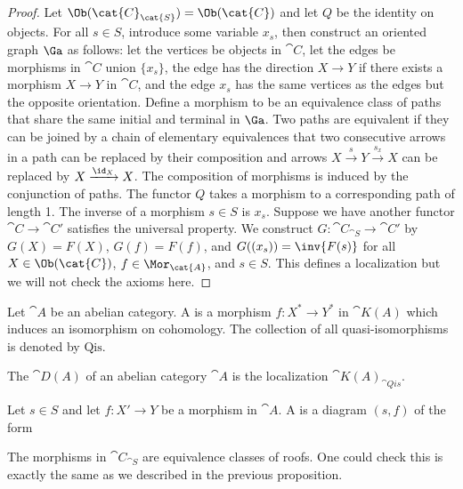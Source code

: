 \begin{proof}
    Let $\Ob({\cat{C}}_{\cat{S}})=\Ob(\cat{C})$ and let $Q$ be the identity on objects. For all $s\in S$, introduce some variable ${x}_{s}$, then construct an oriented graph $\Ga$ as follows: let the vertices be objects in $\cat{C}$, let the edges be morphisms in $\cat{C}$ union $\{{x}_{s}\}$, the edge has the direction $X\to Y$ if there exists a morphism $X\to Y$ in $\cat{C}$, and the edge ${x}_{s}$ has the same vertices as the edges but the opposite orientation. Define a morphism to be an equivalence class of paths that share the same initial and terminal in $\Ga$. Two paths are equivalent if they can be joined by a chain of elementary equivalences that two consecutive arrows in a path can be replaced by their composition and  arrows $X\xrightarrow{s}Y\xrightarrow{{s}_{x}}X$ can be replaced by $X\xrightarrow{{\id}_{X}}X$. The composition of morphisms is induced by the conjunction of paths. The functor $Q$ takes a morphism to a corresponding path of length 1. The inverse of a morphism $s\in S$ is ${x}_{s}$. Suppose we have another functor $\cat{C}\to\cat{C}'$ satisfies the universal property. We construct $G:{\cat{C}}_{\cat{S}}\to\cat{C}'$ by $G(X)=F(X)$, $G(f)=F(f)$, and $G(({x}_{s}))=\inv{F(s)}$ for all $X\in\Ob(\cat{C})$, $f\in{\Mor}_{\cat{A}}$, and $s\in S$. This defines a localization but we will not check the axioms here.
\end{proof}
\begin{definition}
    Let $\cat{A}$ be an abelian category. A  is a morphism $f:{X}^{*}\to{Y}^{*}$ in $\cat{K(A)}$ which induces an isomorphism on cohomology. The collection of all quasi-isomorphisms is denoted by $\text{Qis}$.
\end{definition}
\begin{definition}
    The  $\cat{D(A)}$ of an abelian category $\cat{A}$ is the localization ${\cat{K(A)}}_{\cat{Qis}}$.
\end{definition}
\par
Let $s\in S$ and let $f:X'\to Y$ be a morphism in $\cat{A}$. A  is a diagram $(s,f)$ of the form 
\begin{center}
\end{center}
The morphisms in ${\cat{C}}_{\cat{S}}$ are equivalence classes of roofs. One could check this is exactly the same as we described in the previous proposition.
